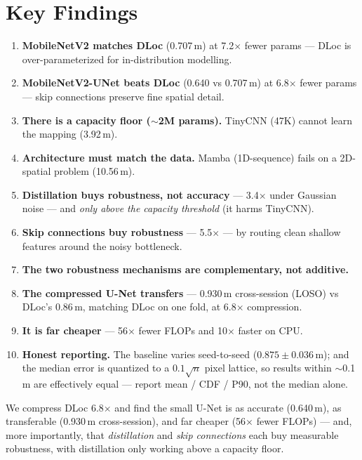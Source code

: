 \documentclass[11pt]{article}
\begin{document}
\section{Key Findings}

\begin{enumerate}[leftmargin=*]
  \item \textbf{MobileNetV2 matches DLoc} (0.707\,m) at 7.2$\times$ fewer params --- DLoc is
        over-parameterized for in-distribution modelling.
  \item \textbf{MobileNetV2-UNet beats DLoc} (0.640 vs 0.707\,m) at 6.8$\times$ fewer params --- skip
        connections preserve fine spatial detail.
  \item \textbf{There is a capacity floor ($\sim$2M params).} TinyCNN (47K) cannot learn the mapping
        (3.92\,m).
  \item \textbf{Architecture must match the data.} Mamba (1D-sequence) fails on a 2D-spatial problem
        (10.56\,m).
  \item \textbf{Distillation buys robustness, not accuracy} --- 3.4$\times$ under Gaussian noise --- and
        \emph{only above the capacity threshold} (it harms TinyCNN).
  \item \textbf{Skip connections buy robustness} --- 5.5$\times$ --- by routing clean shallow features
        around the noisy bottleneck.
  \item \textbf{The two robustness mechanisms are complementary, not additive.}
  \item \textbf{The compressed U-Net transfers} --- 0.930\,m cross-session (LOSO) vs DLoc's 0.86\,m,
        matching DLoc on one fold, at 6.8$\times$ compression.
  \item \textbf{It is far cheaper} --- 56$\times$ fewer FLOPs and 10$\times$ faster on CPU.
  \item \textbf{Honest reporting.} The baseline varies seed-to-seed ($0.875\pm0.036$\,m); and the median
        error is quantized to a $0.1\sqrt{n}$ pixel lattice, so results within $\sim$0.1\,m are
        effectively equal --- report mean / CDF / P90, not the median alone.
\end{enumerate}

\begin{keybox}
We compress DLoc 6.8$\times$ and find the small U-Net is as accurate (0.640\,m), as transferable
(0.930\,m cross-session), and far cheaper (56$\times$ fewer FLOPs) --- and, more importantly, that
\emph{distillation} and \emph{skip connections} each buy measurable robustness, with distillation only
working above a capacity floor.
\end{keybox}
\end{document}

